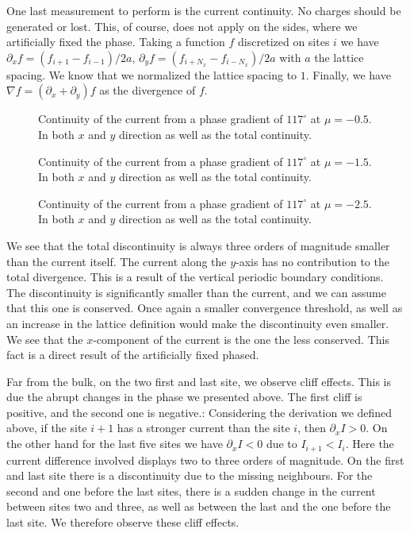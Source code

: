\documentclass[..\main.tex]{subfile}
\begin{document}
One last measurement to perform is the current continuity. No charges should be generated or lost. This, of course, does not apply on
the sides, where we artificially fixed the phase. Taking a function $f$ discretized on sites $i$ we have $\partial_x f = (f_{i+1} - f_{i-1} )/2a$,
$\partial_y f = (f_{i+N_x} - f_{i-N_x} )/2a$ with
$a$ the lattice spacing. We know that we normalized the lattice spacing to $1$. Finally, we have $\nabla f = (\partial_x + \partial_y) f$ as the divergence
of $f$.
\begin{figure}[H]
    \centering
    
    \caption{Continuity of the current from a phase gradient of $117^{\circ}$ at $\mu = -0.5$. In both $x$ and $y$ direction as
    well as the total continuity.}
\end{figure}
\begin{figure}[H]
    \centering
    
    \caption{Continuity of the current from a phase gradient of $117^{\circ}$ at $\mu = -1.5$. In both $x$ and $y$ direction as
    well as the total continuity.}
\end{figure}
\begin{figure}[H]
    \centering
    
    \caption{Continuity of the current from a phase gradient of $117^{\circ}$ at $\mu = -2.5$. In both $x$ and $y$ direction as
    well as the total continuity.}
\end{figure}
We see that the total discontinuity is always three orders of magnitude smaller than the current itself. 
The current along the $y$-axis has no contribution to the total divergence. This is a result of the vertical periodic boundary conditions.
The discontinuity is
significantly smaller than the current, and we can assume that this one is conserved. Once again a smaller convergence threshold,
as well as an increase in the lattice definition would make the discontinuity even smaller.
We see that the $x$-component of the current is the one the less conserved. This fact is a direct result of the artificially fixed phased.

Far from the bulk, on the two first and last site, we observe cliff effects. This is due the abrupt changes in the phase we presented above.
The first cliff is positive, and the second one is negative.:
Considering the derivation we defined above, if the site $i+1$ has a stronger current than the site $i$, then $\partial_x I > 0$.
On the other hand for the last five sites we have $\partial_x I <0$ due to $I_{i+1}< I_i$. Here the current difference involved displays two to three orders of magnitude.
On the first and last site there is a discontinuity due to the missing neighbours. For the second and one before the last sites, there is a sudden change in the current
between sites two and three, as well as between the last and the one before the last site. We therefore observe these cliff effects.\\
\end{document}

